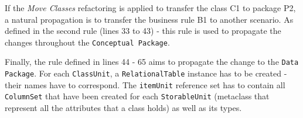 If the \textit{Move Classes} refactoring is applied to transfer the class C1 to package P2, a natural propagation is to transfer the business rule B1 to another scenario. As defined in the second rule (lines 33 to 43) - this rule is used to propagate the changes throughout the \texttt{Conceptual Package}.




 Finally, the rule defined in lines 44 - 65 aims to propagate the change to the \texttt{Data Package}. For each \texttt{ClassUnit}, a \texttt{RelationalTable} instance has to be created - their names have to correspond. The \texttt{itemUnit} %
reference set has to contain all \texttt{ColumnSet} that have been created for each \texttt{StorableUnit} (metaclass that represent all the attributes that a class holds) as well as its types.




